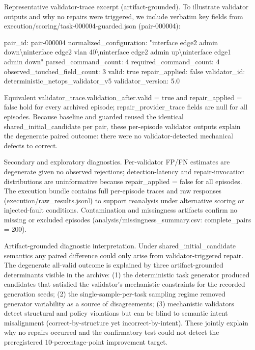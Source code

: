 \documentclass[conference]{IEEEtran}
\begin{document}
Representative validator-trace excerpt (artifact-grounded). To illustrate validator outputs and why no repairs were triggered, we include verbatim key fields from execution/scoring/task-000004-guarded.json (pair-000004):

pair\_id: pair-000004
  normalized\_configuration: "interface edge2 admin down\textbackslash{}ninterface edge2 vlan 40\textbackslash{}ninterface edge2 admin up\textbackslash{}ninterface edge1 admin down"
  parsed\_command\_count: 4
  required\_command\_count: 4
  observed\_touched\_field\_count: 3
  valid: true
  repair\_applied: false
  validator\_id: deterministic\_netops\_validator\_v5
  validator\_version: 5.0

Equivalent validator\_trace.validation\_after.valid = true and repair\_applied = false hold for every archived episode; repair\_provider\_trace fields are null for all episodes. Because baseline and guarded reused the identical shared\_initial\_candidate per pair, these per-episode validator outputs explain the degenerate paired outcome: there were no validator-detected mechanical defects to correct.

Secondary and exploratory diagnostics. Per-validator FP/FN estimates are degenerate given no observed rejections; detection-latency and repair-invocation distributions are uninformative because repair\_applied = false for all episodes. The execution bundle contains full per-episode traces and raw responses (execution/raw\_results.jsonl) to support reanalysis under alternative scoring or injected-fault conditions. Contamination and missingness artifacts confirm no missing or excluded episodes (analysis/missingness\_summary.csv: complete\_pairs = 200).

Artifact-grounded diagnostic interpretation. Under shared\_initial\_candidate semantics any paired difference could only arise from validator-triggered repair. The degenerate all-valid outcome is explained by three artifact-grounded determinants visible in the archive: (1) the deterministic task generator produced candidates that satisfied the validator's mechanistic constraints for the recorded generation seeds; (2) the single-sample-per-task sampling regime removed generator variability as a source of disagreements; (3) mechanistic validators detect structural and policy violations but can be blind to semantic intent misalignment (correct-by-structure yet incorrect-by-intent). These jointly explain why no repairs occurred and the confirmatory test could not detect the preregistered 10-percentage-point improvement target.
\end{document}
